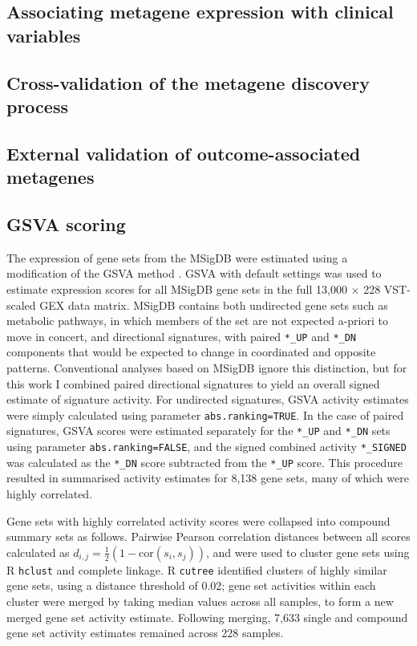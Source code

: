 \documentclass[thesis.tex]{subfiles}
\begin{document}
\subsection{Associating metagene expression with clinical variables}

\subsection{Cross-validation of the metagene discovery process}

\subsection{External validation of outcome-associated metagenes}

\subsection{\acrshort{GSVA} scoring}
The expression of gene sets from the \gls{MSigDB} \cite{Subramanian2005} were estimated using a modification of the \gls{GSVA} method \cite{Hanzelmann2013}.  \gls{GSVA} with default settings was used to estimate expression scores for all \gls{MSigDB} gene sets in the full 13,000 $\times$ 228 \gls{VST}-scaled \gls{GEX} data matrix.  \gls{MSigDB} contains both undirected gene sets such as metabolic pathways, in which members of the set are not expected a-priori to move in concert, and directional signatures, with paired \texttt{*\_UP} and \texttt{*\_DN} components that would be expected to change in coordinated and opposite patterns.  Conventional analyses based on \gls{MSigDB} ignore this distinction, but for this work I combined paired directional signatures to yield an overall signed estimate of signature activity.  For undirected signatures, \gls{GSVA} activity estimates were simply calculated using parameter \texttt{abs.ranking=TRUE}.  In the case of paired signatures, \gls{GSVA} scores were estimated separately for the \texttt{*\_UP} and \texttt{*\_DN} sets using parameter \texttt{abs.ranking=FALSE}, and the signed combined activity \texttt{*\_SIGNED} was calculated as the \texttt{*\_DN} score subtracted from the \texttt{*\_UP} score.  This procedure resulted in summarised activity estimates for 8,138 gene sets, many of which were highly correlated.

Gene sets with highly correlated activity scores were collapsed into compound summary sets as follows.  Pairwise Pearson correlation distances between all scores calculated as $d_{i,j} = \frac{1}{2}(1 - \text{cor}(s_i, s_j))$, and were used to cluster gene sets using R \texttt{hclust} and complete linkage.  R \texttt{cutree} identified clusters of highly similar gene sets, using a distance threshold of 0.02; gene set activities within each cluster were merged by taking median values across all samples, to form a new merged gene set activity estimate.  Following merging, 7,633 single and compound gene set activity estimates remained across 228 samples.
\end{document}
